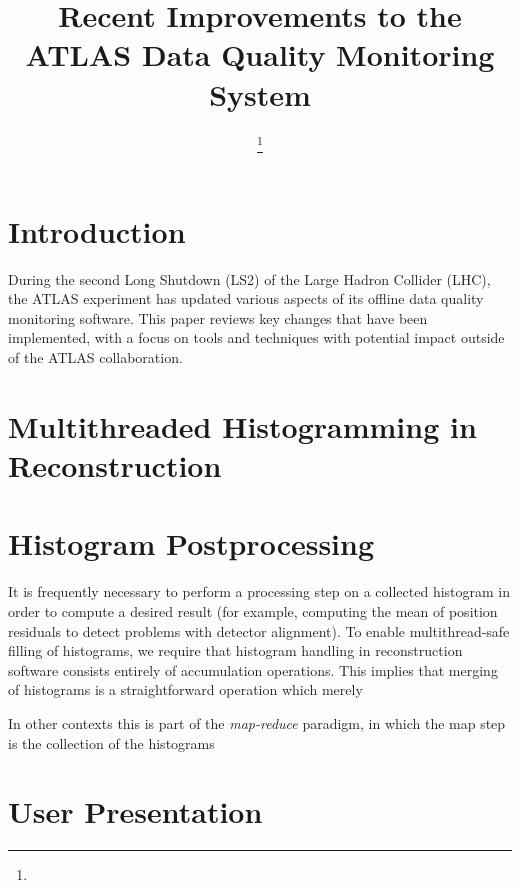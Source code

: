 \documentclass{webofc}
\begin{document}
%
\title{Recent Improvements to the ATLAS Data Quality Monitoring System}
%
%

\author{ \fnsep\thanks{} \and
          \and
         
}


%
\maketitle
%
\section{Introduction}
\label{intro}
During the second Long Shutdown (LS2) of the Large Hadron Collider (LHC), the ATLAS experiment has updated various aspects of its offline data quality monitoring software. This paper reviews key changes that have been implemented, with a focus on tools and techniques with potential impact outside of the ATLAS collaboration.
\section{Multithreaded Histogramming in Reconstruction}

\section{Histogram Postprocessing}
It is frequently necessary to perform a processing step on a collected histogram in order to compute a desired result (for example, computing the mean of position residuals to detect problems with detector alignment). To enable multithread-safe filling of histograms, we require that histogram handling in reconstruction software consists entirely of accumulation operations. This implies that merging of histograms is a straightforward operation which merely 

In other contexts this is part of the \textit{map-reduce} paradigm, in which the map step is the collection of the histograms

\section{User Presentation}
\end{document}
